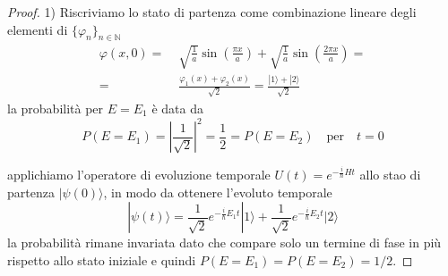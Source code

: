 \begin{proof}
	1) Riscriviamo lo stato di partenza come combinazione lineare degli elementi di $\{\varphi_n\}_{n \in \mathbb{N}}$
	\begin{align*}
		\varphi(x,0) = & \;\sqrt{\frac{1}{a}} \sin \left ( \frac{\pi x}{a} \right) + \sqrt{\frac{1}{a}} \sin \left( \frac{2\pi x}{a}\right) = \\[0.5cm]
		= & \; \frac{\varphi_1(x) + \varphi_2(x)}{\sqrt{2}} = \frac{|1 \rangle + |2 \rangle }{\sqrt{2}}
	\end{align*}
la probabilit\`a per $E = E_1$ \`e data da 
\begin{equation*}
	P(E =E_1) = \left |\frac{1}{\sqrt{2}} \right |^2  = \frac{1}{2} = P(E =E_2) \quad \text{per} \quad t=0
\end{equation*}

applichiamo l'operatore di evoluzione temporale $U(t) = e^{-\frac{i}{\hbar}Ht}$ allo stao di partenza $|\psi(0) \rangle$, in modo da ottenere l'evoluto temporale
\begin{equation*}
	|\psi(t) \rangle = \frac{1}{\sqrt{2}}e^{-\frac{i}{\hbar}E_1t}|1 \rangle + \frac{1}{\sqrt{2}}e^{-\frac{i}{\hbar}E_2t}|2 \rangle 
\end{equation*}
la probabilit\`a rimane invariata dato che compare solo un termine di fase in pi\`u rispetto allo stato iniziale e quindi $P(E = E_1) = P(E = E_2) = 1/2$.
\newline


\end{proof}
